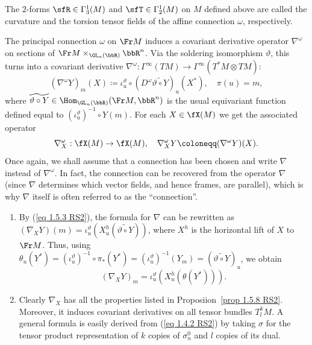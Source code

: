 \begin{defn}
    The $2$-forms $\sfR\in \Gamma_3^1(M)$ and $\sfT\in\Gamma_2^1(M)$ on $M$ defined above are called the curvature and the torsion tensor fields of the affine connection $\omega$, respectively.
\end{defn}


The principal connection $\omega$ on $\Fr M$ induces a covariant derivative operator $\nabla^\omega$ on sections of $\Fr M\times_{\GL_n(\bbR)}\bbR^n$. Via the soldering isomorphism $\vartheta$, this turns into a covariant derivative $\nabla^\omega:\Gamma^\infty(TM)\to \Gamma^\infty(T^\ast M\otimes TM)$:
\[(\nabla^\omega Y)_m(X)\coloneqq \iota_u^\vartheta\circ (D^\omega \widetilde{\vartheta\circ Y})_u(X^\ast),\quad \pi(u)=m,\]
where $\widetilde{\vartheta\circ Y}\in\Hom_{\GL_n(\bbR)}(\Fr M,\bbR^n)$ is the usual equivariant function defined equal to $(\iota_u^\vartheta)^{-1}\circ Y(m)$. For each $X\in\fX(M)$ we get the associated operator
\[\nabla_X^\omega:\fX(M)\to \fX(M),\quad \nabla_X^\omega Y\coloneqq (\nabla^\omega Y)(X).\]
Once again, we shall assume that a connection has been chosen and write $\nabla$ instead of $\nabla^\omega$. In fact, the connection can be recovered from the operator $\nabla$ (since $\nabla$ determines which vector fields, and hence frames, are parallel), which is why $\nabla$ itself is often referred to as the ``connection''.

\begin{rem}\label{rem 2.1.17 RS2}
    \begin{enumerate}
        \item By (\ref{eq 1.5.3 RS2}), the formula for $\nabla$ can be rewritten as $(\nabla_X Y)(m)=\iota_u^\vartheta(X_u^h(\widetilde{\vartheta\circ Y}))$, where $X^h$ is the horizontal lift of $X$ to $\Fr M$. Thus, using $\theta_u(Y^\ast)=(\iota_u^\vartheta)^{-1}\circ\pi_\ast(Y^\ast)=(\iota_u^\vartheta)^{-1}(Y_m)=(\widetilde{\vartheta\circ Y})_u$, we obtain 
        \[(\nabla_X Y)_m=\iota_u^\vartheta(X_u^h(\theta(Y^\ast))).\label{eq 2.1.31 RS2}\]
        \item Clearly $\nabla_X$ has all the properties listed in Proposiion~\ref{prop 1.5.8 RS2}. Moreover, it induces covariant derivatives on all tensor bundles $T^k_l M$. A general formula is easily derived from (\ref{eq 1.4.2 RS2}) by taking $\sigma$ for the tensor product representation of $k$ copies of $\sigma_n^0$ and $l$ copies of its dual.
    \end{enumerate}
\end{rem}

